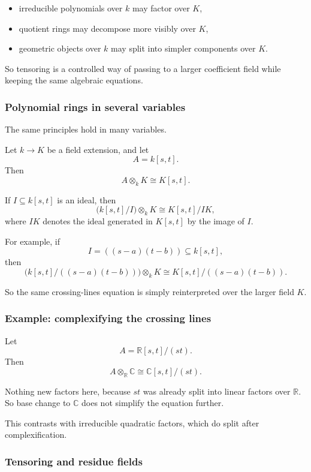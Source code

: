 \documentclass[12pt,a4paper]{article}
\theoremstyle{notespace}
\theoremstyle{definition}
\begin{document}
\begin{itemize}
	\item irreducible polynomials over \(k\) may factor over \(K\),
	\item quotient rings may decompose more visibly over \(K\),
	\item geometric objects over \(k\) may split into simpler components over \(K\).
\end{itemize}

So tensoring is a controlled way of passing to a larger coefficient field while keeping the same algebraic equations.

\subsubsection{Polynomial rings in several variables}

The same principles hold in many variables.

Let \(k\to K\) be a field extension, and let
\[
A=k[s,t].
\]
Then
\[
A\otimes_k K\cong K[s,t].
\]

If \(I\subseteq k[s,t]\) is an ideal, then
\[
\bigl(k[s,t]/I\bigr)\otimes_k K \cong K[s,t]/IK,
\]
where \(IK\) denotes the ideal generated in \(K[s,t]\) by the image of \(I\).

For example, if
\[
I=((s-a)(t-b))\subseteq k[s,t],
\]
then
\[
\bigl(k[s,t]/((s-a)(t-b))\bigr)\otimes_k K
\cong
K[s,t]/((s-a)(t-b)).
\]

So the same crossing-lines equation is simply reinterpreted over the larger field \(K\).

\subsubsection{Example: complexifying the crossing lines}

Let
\[
A=\mathbb{R}[s,t]/(st).
\]
Then
\[
A\otimes_{\mathbb{R}}\mathbb{C}
\cong
\mathbb{C}[s,t]/(st).
\]

Nothing new factors here, because \(st\) was already split into linear factors over \(\mathbb{R}\).  
So base change to \(\mathbb{C}\) does not simplify the equation further.

This contrasts with irreducible quadratic factors, which do split after complexification.

\subsubsection{Tensoring and residue fields}
\end{document}
